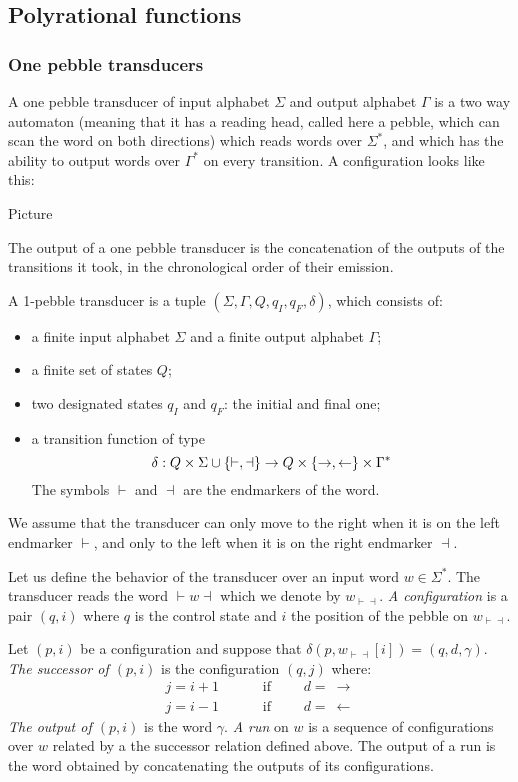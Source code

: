 \subsection{Polyrational functions}

\subsubsection{One pebble transducers}
A one pebble transducer of input alphabet $\Sigma$ and output alphabet $\Gamma$ is a two way automaton (meaning that it has a reading head, called here a pebble, which can scan the word on both directions) which reads words over $\Sigma^*$, and which has the ability to output words over $\Gamma^*$ on every transition. A configuration looks like this:
\begin{center}
Picture
\end{center} 
The output of a one pebble transducer is the concatenation of the outputs of the transitions it took, in the chronological order of their emission.

\begin{definition}\label{def:1pebble}
A 1-pebble transducer is a tuple $(\Sigma,\Gamma, Q, q_I, q_F, \delta)$, which consists of:
\begin{itemize}
\item a finite input alphabet $\Sigma$ and a finite output alphabet $\Gamma$; 
\item a finite set of states $Q$;
\item two designated states $q_I$ and $q_F$: the initial and final one;
\item  a transition function of type 
$$\delta : Q\times \Sigma\cup\{\vdash,\dashv\} \to Q\times\{\rightarrow,\leftarrow\}\times\Gamma^*$$
The symbols  $\vdash$ and $\dashv$ are the endmarkers of the word. 
\end{itemize}
We assume that the transducer can only move to the right when it is on the left endmarker $\vdash$, and only to the left when  it is on the right endmarker $\dashv$.
 \end{definition}


Let us define the behavior of the transducer over an input word $w\in\Sigma^*$. The transducer reads the word $\vdash\!w\!\dashv$ which we denote by  $w_{\vdash\dashv}$. \emph{A configuration} is a pair $(q,i)$ where $q$ is the control state and $i$ the position of the pebble on $w_{\vdash\dashv}$. 

Let $(p,i)$ be a configuration and suppose that $\delta(p, w_{\vdash\dashv}[i])=(q,d,\gamma)$. \emph{The successor of $(p,i)$} is the configuration $(q,j)$
where:
\begin{align*}
 j=i+1 &\qquad \text{ if }\qquad d=\ \rightarrow\\
 j=i-1 &\qquad \text{ if }\qquad d=\ \leftarrow 
\end{align*}
\emph{The output of $(p,i)$} is the word $\gamma$. \emph{A run} on $w$ is a sequence of configurations over $w$ related by a the successor relation defined above. The output of a run is the word obtained by concatenating the outputs of its configurations.

